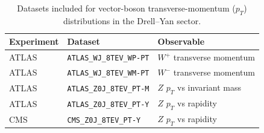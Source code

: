 \documentclass[11pt,a4paper]{article}
\begin{document}
\begin{table}[htbp]
\centering
\small
\begin{tabular}{lll}
\toprule
Experiment & Dataset & Observable \\
\midrule
ATLAS & \texttt{ATLAS\_WJ\_8TEV\_WP-PT} & $W^+$ transverse momentum \\
ATLAS & \texttt{ATLAS\_WJ\_8TEV\_WM-PT} & $W^-$ transverse momentum \\
ATLAS & \texttt{ATLAS\_Z0J\_8TEV\_PT-M} & $Z$ $p_T$ vs invariant mass \\
ATLAS & \texttt{ATLAS\_Z0J\_8TEV\_PT-Y} & $Z$ $p_T$ vs rapidity \\
CMS & \texttt{CMS\_Z0J\_8TEV\_PT-Y} & $Z$ $p_T$ vs rapidity \\
\bottomrule
\end{tabular}
\caption{Datasets included for vector-boson transverse-momentum ($p_T$) distributions in the Drell--Yan sector.}
\label{tab:DY_pt}
\end{table}
\end{document}
